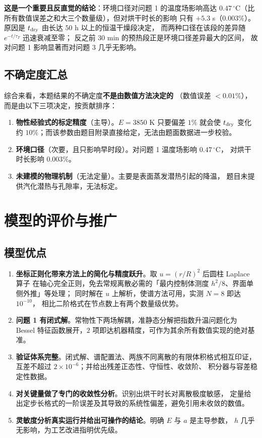 \documentclass[bwprint]{cumcmthesis}
\begin{document}
\textbf{这是一个重要且反直觉的结论}：环境口径对问题 1 的温度场影响高达
$0.47\,^\circ$C（比所有数值误差之和大三个数量级），但对烘干时长的影响
只有 $+5.3$ s（$0.003\%$）。原因是 $t_{\rm dry}$ 由长达 $50$ h 以上的恒温干燥段决定，
而两种口径在该段的差异随 $e^{-t/\tau_T}$ 迅速衰减至零；
反之前 $30$ min 的预热段正是环境口径差异最大的区间，
故对问题 1 影响显著而对问题 3 几乎无影响。

\subsection{不确定度汇总}

综合来看，本题结果的不确定度\textbf{不是由数值方法决定的}
（数值误差 $<0.01\%$），而是由以下三项决定，按贡献排序：

\begin{enumerate}[leftmargin=1.9em,itemsep=2pt]
\item \textbf{物性经验式的标定精度}（主导）。$E=3850$ K 只要偏差 $1\%$ 就会使
$t_{\rm dry}$ 变化约 $10\%$；而该参数由题目附录直接给定，无法由题面数据进一步校验。
\item \textbf{环境口径}（次要，且只影响早时段）。对问题 1 温度场影响 $0.47\,^\circ$C，
对烘干时长影响 $0.003\%$。
\item \textbf{未建模的物理机制}（无法定量）。主要是表面蒸发潜热引起的降温，
题目未提供汽化潜热与孔隙率，无法标定。
\end{enumerate}

\section{模型的评价与推广}
\label{sec:eval}

\subsection{模型优点}

\begin{enumerate}[leftmargin=1.9em,itemsep=2pt]
\item \textbf{坐标正则化带来方法上的简化与精度跃升}。取 $u=(r/R)^2$ 后圆柱 Laplace 算子
在轴心完全正则，免去常规离散必需的「最内控制体测度 $h^2/8$、界面单侧外推」等处理；
同时解在 $u$ 上解析，使谱方法可用，实测 $N=8$ 即达 $10^{-10}$，
相比二阶格式在节点数上有两个数量级优势。
\item \textbf{问题 1 有闭式解}。常物性下两场解耦，准静态分解把指数升温问题化为
Bessel 特征函数展开，$2$ 项即达机器精度，可作为其余所有数值实现的绝对基准。
\item \textbf{验证体系完整}。闭式解、谱配置法、两族不同离散的有限体积格式相互印证，
互差不超过 $2\times10^{-6}$；并给出残差正态性、守恒性、收敛阶、
积分器与容差稳定性数据。
\item \textbf{对关键量做了专门的收敛性分析}。识别出烘干时长对离散极度敏感，
定量给出定步长格式的一阶误差及其导致的系统性偏差，避免引用未收敛的数值。
\item \textbf{灵敏度分析真实运行并给出可操作的结论}。明确 $E$ 与 $a$ 是主导参数，
$h$ 几乎无影响，为工艺改进指明优先级。
\end{enumerate}
\end{document}
